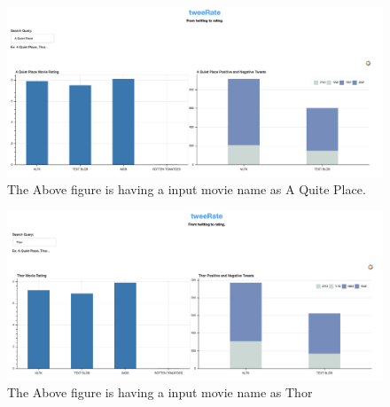 \documentclass[a4paper]{article}
\begin{document}
\begin{figure}
\centering
\includegraphics[width=1.0\textwidth]{Screen_Shot_2018-05-01_at_21_44_15.png}
\caption{\label{fig:result}The Above figure is having a input movie name as A Quite Place.}
\end{figure}
\begin{figure}
\centering
\includegraphics[width=1.0\textwidth]{Screen_Shot_2018-05-01_at_21_51_19.png}
\caption{\label{fig:result}The Above figure is having a input movie name as Thor}
\end{figure}
\end{document}
